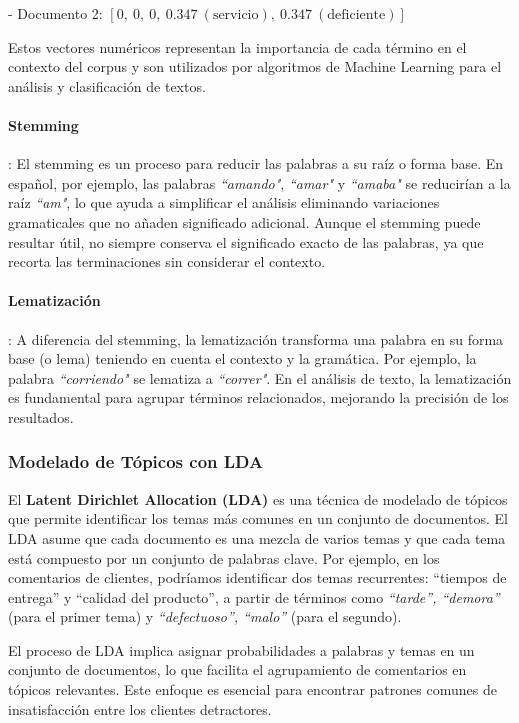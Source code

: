 \documentclass{matematicasud}
\begin{document}
- Documento 2: \([0,\ 0,\ 0,\ 0.347\ (\text{servicio}),\ 0.347\ (\text{deficiente})]\)

Estos vectores numéricos representan la importancia de cada término en el contexto del corpus y son utilizados por algoritmos de Machine Learning para el análisis y clasificación de textos.


\paragraph{Stemming} : El stemming es un proceso para reducir las palabras a su raíz o forma base. En español, por ejemplo, las palabras \textit{``amando"}, \textit{``amar"} y \textit{``amaba"} se reducirían a la raíz \textit{``am"}, lo que ayuda a simplificar el análisis eliminando variaciones gramaticales que no añaden significado adicional. Aunque el stemming puede resultar útil, no siempre conserva el significado exacto de las palabras, ya que recorta las terminaciones sin considerar el contexto.

\paragraph{Lematización} : A diferencia del stemming, la lematización transforma una palabra en su forma base (o lema) teniendo en cuenta el contexto y la gramática. Por ejemplo, la palabra \textit{``corriendo"} se lematiza a \textit{``correr"}. En el análisis de texto, la lematización es fundamental para agrupar términos relacionados, mejorando la precisión de los resultados.


\subsubsection{Modelado de Tópicos con LDA}
El \textbf{Latent Dirichlet Allocation (LDA)} es una técnica de modelado de tópicos que permite identificar los temas más comunes en un conjunto de documentos. El LDA asume que cada documento es una mezcla de varios temas y que cada tema está compuesto por un conjunto de palabras clave. Por ejemplo, en los comentarios de clientes, podríamos identificar dos temas recurrentes: ``tiempos de entrega'' y ``calidad del producto'', a partir de términos como \textit{``tarde'', ``demora''} (para el primer tema) y \textit{``defectuoso'', ``malo''} (para el segundo).


El proceso de LDA implica asignar probabilidades a palabras y temas en un conjunto de documentos, lo que facilita el agrupamiento de comentarios en tópicos relevantes. Este enfoque es esencial para encontrar patrones comunes de insatisfacción entre los clientes detractores.\cite{9}
\end{document}
